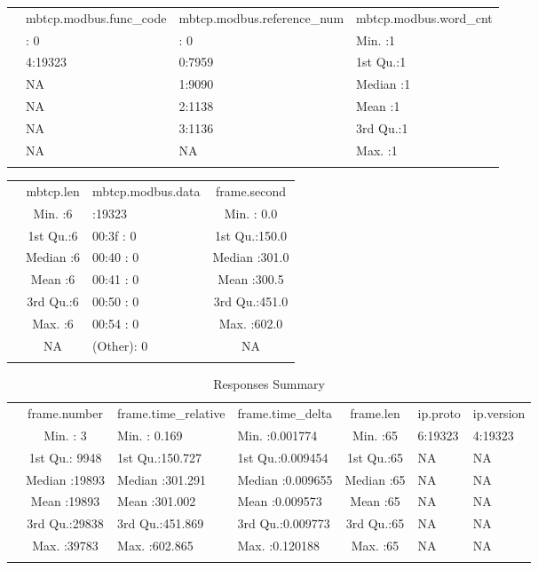 \documentclass[11pt,]{article}
\begin{document}
\begin{longtable}[c]{@{}llll@{}}
\toprule\addlinespace
& mbtcp.modbus.func\_code & mbtcp.modbus.reference\_num &
mbtcp.modbus.word\_cnt
\\\addlinespace
\midrule\endhead
& : 0 & : 0 & Min. :1
\\\addlinespace
& 4:19323 & 0:7959 & 1st Qu.:1
\\\addlinespace
& NA & 1:9090 & Median :1
\\\addlinespace
& NA & 2:1138 & Mean :1
\\\addlinespace
& NA & 3:1136 & 3rd Qu.:1
\\\addlinespace
& NA & NA & Max. :1
\\\addlinespace
\bottomrule
\end{longtable}

\begin{longtable}[c]{@{}lclc@{}}
\toprule\addlinespace
& mbtcp.len & mbtcp.modbus.data & frame.second
\\\addlinespace
\midrule\endhead
& Min. :6 & :19323 & Min. : 0.0
\\\addlinespace
& 1st Qu.:6 & 00:3f : 0 & 1st Qu.:150.0
\\\addlinespace
& Median :6 & 00:40 : 0 & Median :301.0
\\\addlinespace
& Mean :6 & 00:41 : 0 & Mean :300.5
\\\addlinespace
& 3rd Qu.:6 & 00:50 : 0 & 3rd Qu.:451.0
\\\addlinespace
& Max. :6 & 00:54 : 0 & Max. :602.0
\\\addlinespace
& NA & (Other): 0 & NA
\\\addlinespace
\bottomrule
\end{longtable}

\newpage

\begin{longtable}[c]{@{}lcllcll@{}}
\toprule\addlinespace
& frame.number & frame.time\_relative & frame.time\_delta & frame.len &
ip.proto & ip.version
\\\addlinespace
\midrule\endhead
& Min. : 3 & Min. : 0.169 & Min. :0.001774 & Min. :65 & 6:19323 &
4:19323
\\\addlinespace
& 1st Qu.: 9948 & 1st Qu.:150.727 & 1st Qu.:0.009454 & 1st Qu.:65 & NA &
NA
\\\addlinespace
& Median :19893 & Median :301.291 & Median :0.009655 & Median :65 & NA &
NA
\\\addlinespace
& Mean :19893 & Mean :301.002 & Mean :0.009573 & Mean :65 & NA & NA
\\\addlinespace
& 3rd Qu.:29838 & 3rd Qu.:451.869 & 3rd Qu.:0.009773 & 3rd Qu.:65 & NA &
NA
\\\addlinespace
& Max. :39783 & Max. :602.865 & Max. :0.120188 & Max. :65 & NA & NA
\\\addlinespace
\bottomrule
\addlinespace
\caption{Responses Summary}
\end{longtable}
\end{document}
